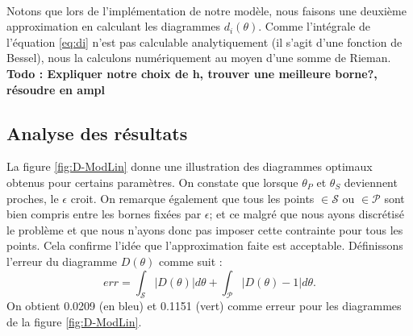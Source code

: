 \\
Notons que lors de l'implémentation de notre modèle, nous faisons une deuxième approximation en calculant les diagrammes $d_i(\theta)$. Comme l'intégrale de l'équation \eqref{eq:di} n'est pas calculable analytiquement (il s'agit d'une fonction de Bessel), nous la calculons numériquement au moyen d'une somme de Rieman.
\textbf{Todo : Expliquer notre choix de h, trouver une meilleure borne?, résoudre en ampl}		\\

\subsection{Analyse des résultats}
La figure \ref{fig:D-ModLin} donne une illustration des diagrammes optimaux obtenus pour certains paramètres. On constate que lorsque $\theta_P$ et $\theta_S$ deviennent proches, le $\epsilon$ croit. On remarque également que tous les points $\in \mathcal{S}$ ou $\in \mathcal{P}$ sont bien compris entre les bornes fixées par $\epsilon$; et ce malgré que nous ayons discrétisé le problème et que nous n'ayons donc pas imposer cette contrainte pour tous les points. Cela confirme l'idée que l'approximation faite est acceptable. Définissons l'erreur du diagramme $D(\theta)$ comme suit : 
\begin{equation} \label{eq:erreurDiagramme}
err = \int _{\mathcal{S}} |D(\theta)| d\theta + \int_{\mathcal{P}} |D(\theta) - 1| d\theta.
\end{equation}
On obtient 0.0209 (en bleu) et 0.1151 (vert) comme erreur pour les diagrammes de la figure \ref{fig:D-ModLin}. 
